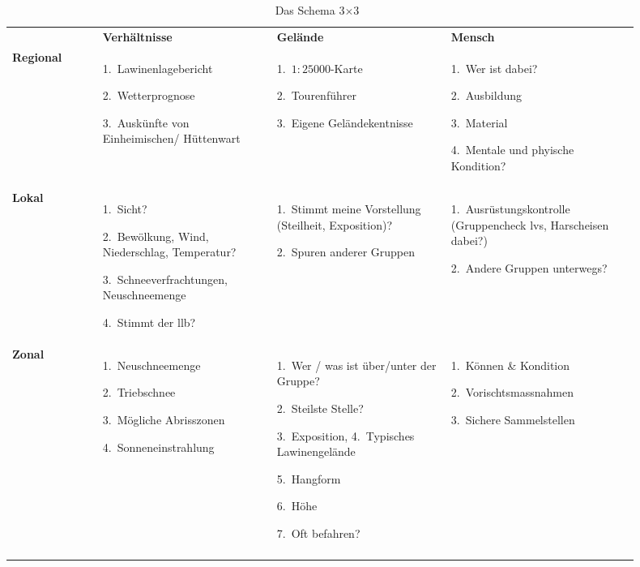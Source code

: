 \begin{table}[hb] 
  \centering
  \renewcommand{\arraystretch}{2}
  \begin{tabular}{|p{0.13\linewidth} | p{0.25\linewidth} | p{0.25\linewidth} | p{0.27\linewidth} |}
    \hhline{|----|}
   &  \textbf{Verhältnisse} & \textbf{Gelände} & \textbf{Mensch} \\
   \hhline{|----|}
  \textbf{Regional} &  1.~Lawinenlagebericht \par 2.~Wetterprognose \par 3.~Auskünfte von Einheimischen/ Hüttenwart &  1.~$1:25000$-Karte \par 2.~Tourenführer \par 3.~Eigene Geländekentnisse & 1.~Wer ist dabei? \par 2.~Ausbildung \par 3.~Material \par 4.~Mentale und phyische Kondition?  \\ \hhline{|----|}
  \textbf{Lokal} & 1.~Sicht? \par 2.~Bewölkung, Wind, Niederschlag, Temperatur? \par 3.~Schneeverfrachtungen, Neuschneemenge \par 4.~Stimmt der \gls{llb}? & 1.~Stimmt meine Vorstellung (Steilheit, Exposition)? \par 2.~Spuren anderer Gruppen & 1.~Ausrüstungskontrolle (Gruppencheck \acrshort{lvs}, Harscheisen dabei?) \par 2.~Andere Gruppen unterwegs? \\ \hhline{|----|}
  \textbf{Zonal} & 1.~Neuschneemenge \par 2.~Triebschnee \par 3.~Mögliche Abrisszonen \par 4.~Sonneneinstrahlung & 1.~Wer / was ist über/unter der Gruppe? \par 2.~Steilste Stelle? \par 3.~Exposition, 4.~Typisches Lawinengelände \par 5.~Hangform \par 6.~Höhe \par 7.~Oft befahren? & 1.~Können \& Kondition \par 2.~Vorischtsmassnahmen \par 3.~Sichere Sammelstellen \\
   \hhline{|----|}
  \end{tabular}
  \renewcommand{\arraystretch}{1}
  \caption{Das Schema 3$\times$3~\cite{munter}}\label{tab:3x3table}
\end{table}

